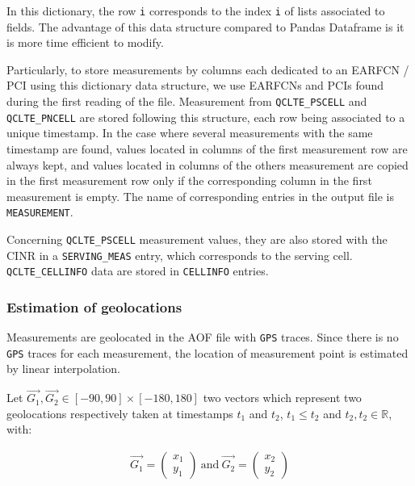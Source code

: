 \documentclass[a4paper, 11pt]{report}
\begin{document}
 
    In this dictionary, the row \texttt{i} corresponds to the index \texttt{i} of lists associated to fields. The advantage of this data structure compared to Pandas Dataframe is it is more time efficient to modify. \newline
    
    Particularly, to store measurements by columns each dedicated to an EARFCN / PCI using this dictionary data structure, we use EARFCNs and PCIs found during the first reading of the file. Measurement from \texttt{QCLTE\_PSCELL} and \texttt{QCLTE\_PNCELL} are stored following this structure, each row being associated to a unique timestamp. In the case where several measurements with the same timestamp are found, values located in columns of the first measurement row are always kept, and values located in columns of the others measurement are copied in the first measurement row only if the corresponding column in the first measurement is empty. The name of corresponding entries in the output file is \texttt{MEASUREMENT}.\newline
    
    Concerning \texttt{QCLTE\_PSCELL} measurement values, they are also stored with the CINR in a \texttt{SERVING\_MEAS} entry, which corresponds to the serving cell. \texttt{QCLTE\_CELLINFO} data are stored in \texttt{CELLINFO} entries.
    
    \subsubsection{Estimation of geolocations}
    
    Measurements are geolocated in the AOF file with \texttt{GPS} traces. Since there is no \texttt{GPS} traces for each measurement, the location of measurement point is estimated by linear interpolation. \newline
    
    Let $\overrightarrow{G_1}, \overrightarrow{G_2} \in [-90, 90] \times [-180, 180]$ two vectors which represent two geolocations respectively taken at timestamps $t_1$ and $t_2$, $t_1 \leq t_2$ and $t_2, t_2 \in \mathbb{R}$, with:
    
    \begin{align}
        \overrightarrow{G_1} = \begin{pmatrix}
            x_1 \\ y_1
        \end{pmatrix} \ \text{and} \ \overrightarrow{G_2} = \begin{pmatrix}
            x_2 \\ y_2
        \end{pmatrix}
    \end{align}
    
\end{document}
